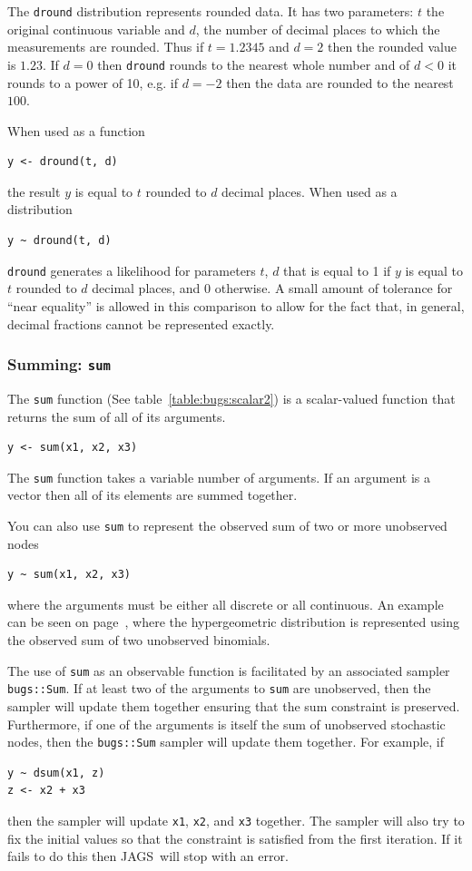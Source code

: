 \documentclass[11pt, a4paper, titlepage]{report}
\newcommand{\JAGS}{\textsf{JAGS}}
\begin{document}
The \texttt{dround} distribution represents rounded data. It has two
parameters: $t$ the original continuous variable and $d$, the number
of decimal places to which the measurements are rounded. Thus if
$t=1.2345$ and $d=2$ then the rounded value is $1.23$. If $d=0$ then
\texttt{dround} rounds to the nearest whole number and of $d < 0$ it
rounds to a power of 10, e.g. if $d=-2$ then the data are rounded to
the nearest $100$.

When used as a function
\begin{verbatim}
y <- dround(t, d)
\end{verbatim}
the result $y$ is equal to $t$ rounded to $d$ decimal places. When
used as a distribution
\begin{verbatim}
y ~ dround(t, d)
\end{verbatim}
\texttt{dround} generates a likelihood for parameters $t$, $d$ that is
equal to 1 if $y$ is equal to $t$ rounded to $d$ decimal places, and 0
otherwise. A small amount of tolerance for ``near equality'' is
allowed in this comparison to allow for the fact that, in general,
decimal fractions cannot be represented exactly.

\subsubsection{Summing: \texttt{sum}}
\label{bugs:sum}

The \texttt{sum} function (See table~\ref{table:bugs:scalar2}) is
a scalar-valued function that returns the sum of all of its arguments.
\begin{verbatim}
y <- sum(x1, x2, x3)
\end{verbatim}
The \texttt{sum} function takes a variable number of arguments. If
an argument is a vector then all of its elements are summed together.

You can also use \texttt{sum} to represent the observed sum of two
or more unobserved nodes
\begin{verbatim}
y ~ sum(x1, x2, x3)
\end{verbatim}
where the arguments must be either all discrete or all continuous.  An
example can be seen on page~\pageref{bugs:dhyper}, where the
hypergeometric distribution is represented using the observed sum of
two unobserved binomials.

The use of \texttt{sum} as an observable function is facilitated by an
associated sampler \texttt{bugs::Sum}. If at least two of the
arguments to \texttt{sum} are unobserved, then the sampler will update
them together ensuring that the sum constraint is preserved.
Furthermore, if one of the arguments is itself the sum of unobserved
stochastic nodes, then the \texttt{bugs::Sum} sampler will update them
together. For example, if
\begin{verbatim}
y ~ dsum(x1, z)
z <- x2 + x3
\end{verbatim}
then the sampler will update {\tt x1}, {\tt x2}, and {\tt x3}
together. The sampler will also try to fix the initial values so that
the constraint is satisfied from the first iteration. If it fails to
do this then \JAGS\ will stop with an error.
\end{document}
